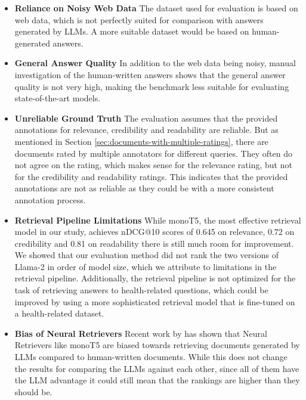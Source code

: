 \begin{itemize}
    \item 	\textbf{Reliance on Noisy Web Data} The dataset used for evaluation is based on web data, which is not perfectly suited for comparison with answers generated by LLMs. A more suitable dataset would be based on human-generated answers.

    \item 	\textbf{General Answer Quality} In addition to the web data being noisy, manual investigation of the human-written answers shows that the general answer quality is not very high, making the benchmark less suitable for evaluating state-of-the-art models.

    \item 	\textbf{Unreliable Ground Truth} The evaluation assumes that the provided annotations for relevance, credibility and readability are reliable. But as mentioned in Section \ref{sec:documents-with-multiple-ratings}, there are documents rated by multiple annotators for different queries. They often do not agree on the rating, which makes sense for the relevance rating, but not for the credibility and readability ratings. This indicates that the provided annotations are not as reliable as they could be with a more consistent annotation process.

    \item 	\textbf{Retrieval Pipeline Limitations} While monoT5, the most effective retrieval model in our study, achieves nDCG@10 scores of 0.645 on relevance, 0.72 on credibility and 0.81 on readability there is still much room for improvement. We showed that our evaluation method did not rank the two versions of Llama-2 in order of model size, which we attribute to limitations in the retrieval pipeline. Additionally, the retrieval pipeline is not optimized for the task of retrieving answers to health-related questions, which could be improved by using a more sophisticated retrieval model that is fine-tuned on a health-related dataset.

    \item   \textbf{Bias of Neural Retrievers} Recent work by \cite{dai:2023:llms} has shown that Neural Retrievers like monoT5 are biased towards retrieving documents generated by LLMs compared to human-written documents. While this does not change the results for comparing the LLMs against each other, since all of them have the LLM advantage it could still mean that the rankings are higher than they should be. 
\end{itemize}
